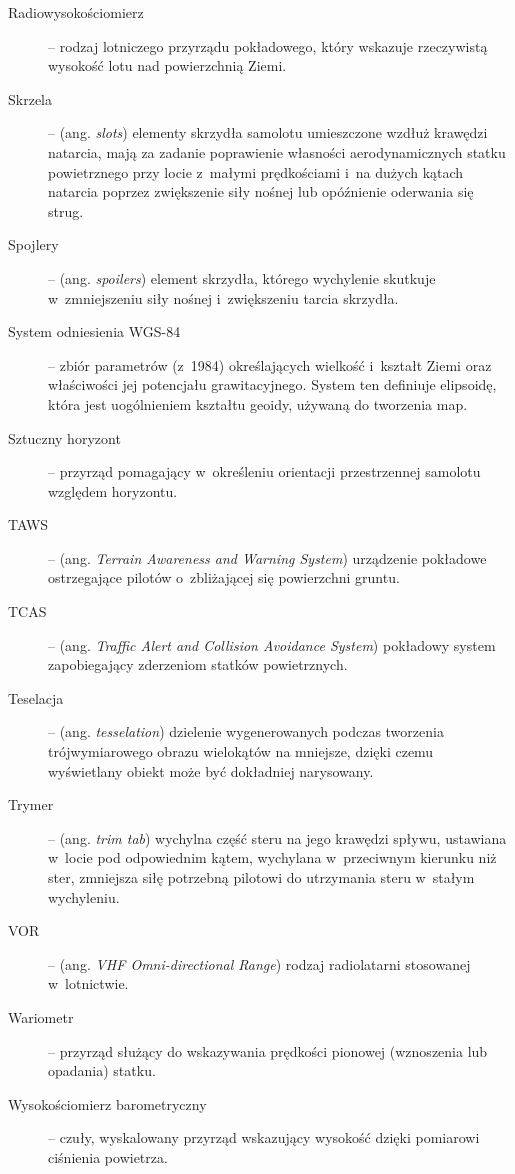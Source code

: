 \documentclass{mwrep}
\begin{document}
\begin{description}
\item[Radiowysokościomierz] -- rodzaj lotniczego przyrządu pokładowego, \linebreak który wskazuje rzeczywistą wysokość lotu nad powierzchnią Ziemi.
\item[Skrzela] -- (ang. \emph{slots}) elementy skrzydła samolotu umieszczone wzdłuż krawędzi natarcia, mają za zadanie poprawienie własności aerodynamicznych statku powietrznego przy locie z~małymi prędkościami i~na dużych kątach natarcia poprzez zwiększenie siły nośnej lub opóźnienie oderwania się strug.
\item[Spojlery] -- (ang. \emph{spoilers}) element skrzydła, którego wychylenie skutkuje w~zmniejszeniu siły nośnej i~zwiększeniu tarcia skrzydła.
\item[System odniesienia WGS-84] -- zbiór parametrów (z~1984) określających wielkość i~kształt Ziemi oraz właściwości jej potencjału grawitacyjnego. System ten definiuje elipsoidę, która jest uogólnieniem kształtu geoidy, używaną do tworzenia map.
\item[Sztuczny horyzont] -- przyrząd pomagający w~określeniu orientacji przestrzennej samolotu względem horyzontu.
\item[TAWS] -- (ang. \emph{Terrain Awareness and Warning System}) urządzenie pokładowe ostrzegające pilotów o~zbliżającej się powierzchni gruntu.
\item[TCAS] -- (ang. \emph{Traffic Alert and Collision Avoidance System}) pokładowy system zapobiegający zderzeniom statków powietrznych.
\item[Teselacja] -- (ang. \emph{tesselation}) dzielenie wygenerowanych podczas tworzenia trójwymiarowego obrazu wielokątów na mniejsze, dzięki czemu wyświetlany obiekt może być dokładniej narysowany.
\item[Trymer] -- (ang. \emph{trim tab}) wychylna część steru na jego krawędzi spływu, ustawiana w~locie pod odpowiednim kątem, wychylana w~przeciwnym kierunku niż ster, zmniejsza siłę potrzebną pilotowi do utrzymania steru w~stałym wychyleniu.
\item[VOR] -- (ang. \emph{VHF Omni-directional Range}) rodzaj radiolatarni stosowanej w~lotnictwie.
\item[Wariometr] -- przyrząd służący do wskazywania prędkości pionowej \linebreak (wznoszenia lub opadania) statku.
\item[Wysokościomierz barometryczny] -- czuły, wyskalowany przyrząd \linebreak wskazujący wysokość dzięki pomiarowi ciśnienia powietrza.
\end{description}
\end{document}
